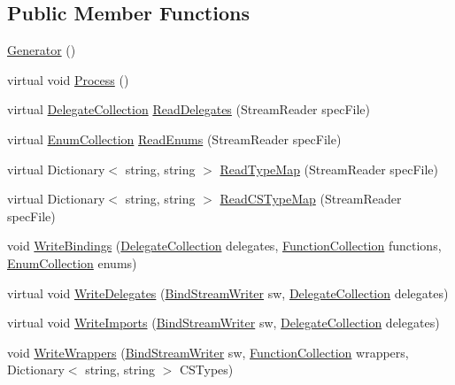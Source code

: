 \subsection*{Public Member Functions}
\begin{DoxyCompactItemize}
\item 
\hyperlink{class_bind_1_1_g_l2_1_1_generator_a01d1759fafcc35b98b467b27d6689b72}{Generator} ()
\item 
virtual void \hyperlink{class_bind_1_1_g_l2_1_1_generator_ab441955d4b551aa1a2a9310c16acf3a1}{Process} ()
\item 
virtual \hyperlink{class_bind_1_1_structures_1_1_delegate_collection}{DelegateCollection} \hyperlink{class_bind_1_1_g_l2_1_1_generator_a3cdb6d9ff4e8ff8bafca413a6b60d397}{ReadDelegates} (StreamReader specFile)
\item 
virtual \hyperlink{class_bind_1_1_structures_1_1_enum_collection}{EnumCollection} \hyperlink{class_bind_1_1_g_l2_1_1_generator_ac9d3b484577690b872bea635d8c47487}{ReadEnums} (StreamReader specFile)
\item 
virtual Dictionary$<$ string, string $>$ \hyperlink{class_bind_1_1_g_l2_1_1_generator_a00dd418d8a6b6de5fefd58547fdc4285}{ReadTypeMap} (StreamReader specFile)
\item 
virtual Dictionary$<$ string, string $>$ \hyperlink{class_bind_1_1_g_l2_1_1_generator_ad712b466f688cf08c7d43565d2655736}{ReadCSTypeMap} (StreamReader specFile)
\item 
void \hyperlink{class_bind_1_1_g_l2_1_1_generator_addd1e680678299826c8498c0f78e3475}{WriteBindings} (\hyperlink{class_bind_1_1_structures_1_1_delegate_collection}{DelegateCollection} delegates, \hyperlink{class_bind_1_1_structures_1_1_function_collection}{FunctionCollection} functions, \hyperlink{class_bind_1_1_structures_1_1_enum_collection}{EnumCollection} enums)
\item 
virtual void \hyperlink{class_bind_1_1_g_l2_1_1_generator_adc8577e51e679d8e92630b5a3b329a19}{WriteDelegates} (\hyperlink{class_bind_1_1_bind_stream_writer}{BindStreamWriter} sw, \hyperlink{class_bind_1_1_structures_1_1_delegate_collection}{DelegateCollection} delegates)
\item 
virtual void \hyperlink{class_bind_1_1_g_l2_1_1_generator_a3563a5a6f3fe00b86e2012b5b0901593}{WriteImports} (\hyperlink{class_bind_1_1_bind_stream_writer}{BindStreamWriter} sw, \hyperlink{class_bind_1_1_structures_1_1_delegate_collection}{DelegateCollection} delegates)
\item 
void \hyperlink{class_bind_1_1_g_l2_1_1_generator_a1beebb5011a87b8c04e5370f3433e947}{WriteWrappers} (\hyperlink{class_bind_1_1_bind_stream_writer}{BindStreamWriter} sw, \hyperlink{class_bind_1_1_structures_1_1_function_collection}{FunctionCollection} wrappers, Dictionary$<$ string, string $>$ CSTypes)

\end{DoxyCompactItemize}
